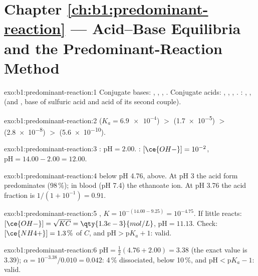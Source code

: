 \section*{Chapter \ref{ch:b1:predominant-reaction} --- Acid--Base Equilibria and the Predominant-Reaction Method}

\begin{solution}{exo:b1:predominant-reaction:1}
Conjugate bases: , , , . Conjugate
acids: , , , . : ,
,  (and , base of sulfuric acid and acid of
its second couple).
\end{solution}

\begin{solution}{exo:b1:predominant-reaction:2}
 ($K_a = \num{6.9e-4}$) $>$  (\num{1.7e-5}) $>$ 
(\num{2.8e-8}) $>$  (\num{5.6e-10}).
\end{solution}

\begin{solution}{exo:b1:predominant-reaction:3}
: $\mathrm{pH} = 2.00$. : $[\ce{OH-}] = 10^{-2}$,
$\mathrm{pH} = 14.00 - 2.00 = 12.00$.
\end{solution}

\begin{solution}{exo:b1:predominant-reaction:4}
 below pH 4.76,  above. At pH 3 the acid form
predominates (98\,\%); in blood (pH 7.4) the ethanoate ion. At pH 3.76 the
acid fraction is $1/(1 + 10^{-1}) = 0.91$.
\end{solution}

\begin{solution}{exo:b1:predominant-reaction:5}
 , $K = 10^{-(14.00 -
9.25)} = 10^{-4.75}$. If little  reacts: $[\ce{OH-}] = \sqrt{K C} =
\qty{1.3e-3}{mol/L}$, $\mathrm{pH} = 11.13$. Check: $[\ce{NH4+}] = 1.3\,\%$
of $C$, and $\mathrm{pH} > \mathrm{p}K_a + 1$: valid.
\end{solution}

\begin{solution}{exo:b1:predominant-reaction:6}
$\mathrm{pH} = \frac12(4.76 + 2.00) = 3.38$ (the exact value is 3.39);
$\alpha = 10^{-3.38}/0.010 = 0.042$: 4\,\% dissociated, below 10\,\%, and
$\mathrm{pH} < \mathrm{p}K_a - 1$: valid.
\end{solution}

